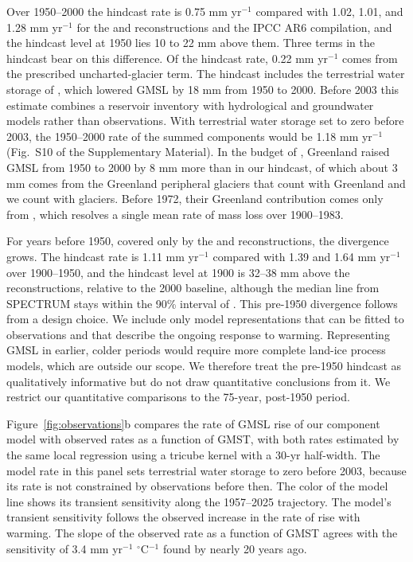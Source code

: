 \documentclass[draft,linenumbers]{agujournal2025}
\begin{document}
Over 1950--2000 the hindcast rate is 0.75 mm yr$^{-1}$ compared with 1.02, 1.01, and 1.28 mm yr$^{-1}$ for the \citet{Frederikse2020} and \citet{Dangendorf2024} reconstructions and the IPCC AR6 compilation, and the hindcast level at 1950 lies 10 to 22 mm above them. Three terms in the hindcast bear on this difference. Of the hindcast rate, 0.22 mm yr$^{-1}$ comes from the prescribed uncharted-glacier term. The hindcast includes the terrestrial water storage of \citet{Frederikse2020}, which lowered GMSL by 18 mm from 1950 to 2000. Before 2003 this estimate combines a reservoir inventory with hydrological and groundwater models rather than observations. With terrestrial water storage set to zero before 2003, the 1950--2000 rate of the summed components would be 1.18 mm yr$^{-1}$ (Fig.~S10 of the Supplementary Material). In the budget of \citet{Frederikse2020}, Greenland raised GMSL from 1950 to 2000 by 8 mm more than in our hindcast, of which about 3 mm comes from the Greenland peripheral glaciers that \citet{Frederikse2020} count with Greenland and we count with glaciers. Before 1972, their Greenland contribution comes only from \citet{Kjeldsen2015}, which resolves a single mean rate of mass loss over 1900--1983. 

For years before 1950, covered only by the \citet{Frederikse2020} and \citet{Dangendorf2024} reconstructions, the divergence grows. The hindcast rate is 1.11 mm yr$^{-1}$ compared with 1.39 and 1.64 mm yr$^{-1}$ over 1900--1950, and the hindcast level at 1900 is 32--38 mm above the reconstructions, relative to the 2000 baseline, although the median line from SPECTRUM stays within the 90\% interval of \citet{Dangendorf2024}. This pre-1950 divergence follows from a design choice. We include only model representations that can be fitted to observations and that describe the ongoing response to warming. Representing GMSL in earlier, colder periods would require more complete land-ice process models, which are outside our scope. We therefore treat the pre-1950 hindcast as qualitatively informative but do not draw quantitative conclusions from it. We restrict our quantitative comparisons to the 75-year, post-1950 period.

Figure~\ref{fig:observations}b compares the rate of GMSL rise of our component model with observed rates as a function of GMST, with both rates estimated by the same local regression using a tricube kernel with a 30-yr half-width. The model rate in this panel sets terrestrial water storage to zero before 2003, because its rate is not constrained by observations before then. The color of the model line shows its transient sensitivity along the 1957--2025 trajectory. The model's transient sensitivity follows the observed increase in the rate of rise with warming. The slope of the observed rate as a function of GMST agrees with the sensitivity of 3.4 mm yr$^{-1}$ $^\circ$C$^{-1}$ found by \citet{Rahmstorf2007} nearly 20 years ago.
\end{document}
